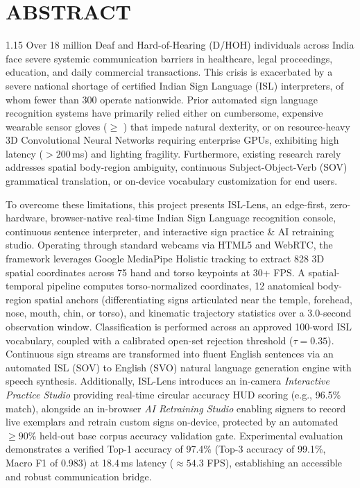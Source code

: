 \chapter*{ABSTRACT}
\begin{spacing}{1.15}
Over 18 million Deaf and Hard-of-Hearing (D/HOH) individuals across India face severe systemic communication barriers in healthcare, legal proceedings, education, and daily commercial transactions. This crisis is exacerbated by a severe national shortage of certified Indian Sign Language (ISL) interpreters, of whom fewer than 300 operate nationwide. Prior automated sign language recognition systems have primarily relied either on cumbersome, expensive wearable sensor gloves ($\geq$ ) that impede natural dexterity, or on resource-heavy 3D Convolutional Neural Networks requiring enterprise GPUs, exhibiting high latency ($>200$\,ms) and lighting fragility. Furthermore, existing research rarely addresses spatial body-region ambiguity, continuous Subject-Object-Verb (SOV) grammatical translation, or on-device vocabulary customization for end users.

To overcome these limitations, this project presents ISL-Lens, an edge-first, zero-hardware, browser-native real-time Indian Sign Language recognition console, continuous sentence interpreter, and interactive sign practice \& AI retraining studio. Operating through standard webcams via HTML5 and WebRTC, the framework leverages Google MediaPipe Holistic tracking to extract 828 3D spatial coordinates across 75 hand and torso keypoints at 30+ FPS. A spatial-temporal pipeline computes torso-normalized coordinates, 12 anatomical body-region spatial anchors (differentiating signs articulated near the temple, forehead, nose, mouth, chin, or torso), and kinematic trajectory statistics over a 3.0-second observation window. Classification is performed across an approved 100-word ISL vocabulary, coupled with a calibrated open-set rejection threshold ($\tau = 0.35$). Continuous sign streams are transformed into fluent English sentences via an automated ISL (SOV) to English (SVO) natural language generation engine with speech synthesis. Additionally, ISL-Lens introduces an in-camera \textit{Interactive Practice Studio} providing real-time circular accuracy HUD scoring (e.g., 96.5\% match), alongside an in-browser \textit{AI Retraining Studio} enabling signers to record live exemplars and retrain custom signs on-device, protected by an automated $\ge 90\%$ held-out base corpus accuracy validation gate. Experimental evaluation demonstrates a verified Top-1 accuracy of 97.4\% (Top-3 accuracy of 99.1\%, Macro F1 of 0.983) at 18.4\,ms latency ($\approx 54.3$ FPS), establishing an accessible and robust communication bridge.
\end{spacing}

